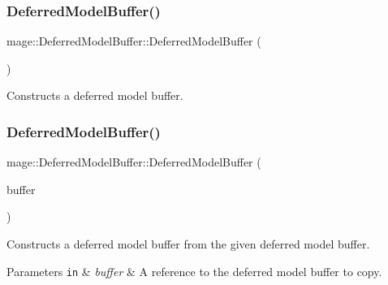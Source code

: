 \subsubsection{\texorpdfstring{Deferred\+Model\+Buffer()}{DeferredModelBuffer()}\hspace{0.1cm}{\footnotesize\ttfamily [1/3]}}
{\footnotesize\ttfamily mage\+::\+Deferred\+Model\+Buffer\+::\+Deferred\+Model\+Buffer (\begin{DoxyParamCaption}{ }\end{DoxyParamCaption})}

Constructs a deferred model buffer. \hypertarget{structmage_1_1_deferred_model_buffer_ae90c52678b98c25e2ff966f0b4d79663}{}\label{structmage_1_1_deferred_model_buffer_ae90c52678b98c25e2ff966f0b4d79663} 
\subsubsection{\texorpdfstring{Deferred\+Model\+Buffer()}{DeferredModelBuffer()}\hspace{0.1cm}{\footnotesize\ttfamily [2/3]}}
{\footnotesize\ttfamily mage\+::\+Deferred\+Model\+Buffer\+::\+Deferred\+Model\+Buffer (\begin{DoxyParamCaption}\item[{const \hyperlink{structmage_1_1_deferred_model_buffer}{Deferred\+Model\+Buffer} \&}]{buffer }\end{DoxyParamCaption})\hspace{0.3cm}{\ttfamily [default]}}

Constructs a deferred model buffer from the given deferred model buffer.


\begin{DoxyParams}[1]{Parameters}
\mbox{\tt in}  & {\em buffer} & A reference to the deferred model buffer to copy. \\
\hline
\end{DoxyParams}
\hypertarget{structmage_1_1_deferred_model_buffer_a0545918fe84e92af3d444039845dad63}{}\label{structmage_1_1_deferred_model_buffer_a0545918fe84e92af3d444039845dad63} 
